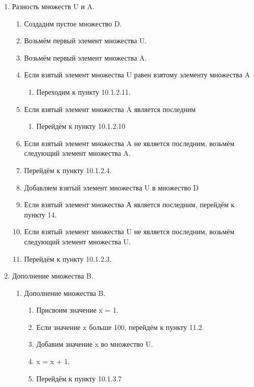 \documentclass[a4paper,12pt]{extarticle}
\begin{document}
\begin{enumerate}
\begin{enumerate}[label*=\arabic*.]
\begin{enumerate}[label*=\arabic*.]
\begin{enumerate}[label*=\arabic*.]
      \end{enumerate}
      \item Разность множеств U и A.
      \begin{enumerate}[label*=\arabic*.]
        \item Создадим пустое множество D.
        \item Возьмём первый элемент множества U.
        \item Возьмём первый элемент множества A.
        \item Если взятый элемент множества U равен взятому элементу множества A
        \begin{enumerate}[label*=\arabic*.]
          \item Переходим к пункту 10.1.2.11.
        \end{enumerate}
        \item Если взятый элемент множества A является последним
        \begin{enumerate}[label*=\arabic*.]
          \item Перейдём к пункту 10.1.2.10
        \end{enumerate}
        \item Если взятый элемент множества A не является последним, возьмём следующий элемент множества A.
        \item Перейдём к пункту 10.1.2.4.
        \item Добавляем взятый элемент множества U в множество D
        \item Если взятый элемент множества А является последним, перейдём к пункту 14.
        \item Если взятый элемент множества U не является последним, возьмём следующий элемент множества U.
        \item Перейдём к пункту 10.1.2.3.
      \end{enumerate}
      \item Дополнение множества B.
      \begin{enumerate}[label*=\arabic*.]
        \item Дополнение множества B.
        \begin{enumerate}[label*=\arabic*.]
          \item Присвоим значение x = 1.
          \item Если значение x больше 100, перейдём к пункту 11.2.
          \item Добавим значение x во множество U.
          \item x = x + 1.
          \item Перейдём к пункту 10.1.3.7

\end{enumerate}
\end{enumerate}
\end{enumerate}
\end{enumerate}
\end{enumerate}
\end{document}
